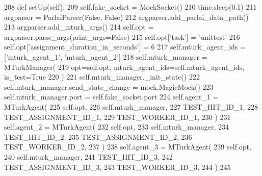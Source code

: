 \begin{DoxyCode}
208     \textcolor{keyword}{def }setUp(self):
209         self.fake\_socket = MockSocket()
210         time.sleep(0.1)
211         argparser = ParlaiParser(\textcolor{keyword}{False}, \textcolor{keyword}{False})
212         argparser.add\_parlai\_data\_path()
213         argparser.add\_mturk\_args()
214         self.opt = argparser.parse\_args(print\_args=\textcolor{keyword}{False})
215         self.opt[\textcolor{stringliteral}{'task'}] = \textcolor{stringliteral}{'unittest'}
216         self.opt[\textcolor{stringliteral}{'assignment\_duration\_in\_seconds'}] = 6
217         self.mturk\_agent\_ids = [\textcolor{stringliteral}{'mturk\_agent\_1'}, \textcolor{stringliteral}{'mturk\_agent\_2'}]
218         self.mturk\_manager = MTurkManager(
219             opt=self.opt, mturk\_agent\_ids=self.mturk\_agent\_ids, is\_test=\textcolor{keyword}{True}
220         )
221         self.mturk\_manager.\_init\_state()
222         self.mturk\_manager.send\_state\_change = mock.MagicMock()
223         self.mturk\_manager.port = self.fake\_socket.port
224         self.agent\_1 = MTurkAgent(
225             self.opt,
226             self.mturk\_manager,
227             TEST\_HIT\_ID\_1,
228             TEST\_ASSIGNMENT\_ID\_1,
229             TEST\_WORKER\_ID\_1,
230         )
231         self.agent\_2 = MTurkAgent(
232             self.opt,
233             self.mturk\_manager,
234             TEST\_HIT\_ID\_2,
235             TEST\_ASSIGNMENT\_ID\_2,
236             TEST\_WORKER\_ID\_2,
237         )
238         self.agent\_3 = MTurkAgent(
239             self.opt,
240             self.mturk\_manager,
241             TEST\_HIT\_ID\_3,
242             TEST\_ASSIGNMENT\_ID\_3,
243             TEST\_WORKER\_ID\_3,
244         )
245 
\end{DoxyCode}
\mbox{\label{classparlai_1_1mturk_1_1core_1_1dev_1_1test_1_1test__mturk__manager_1_1TestMTurkManagerUnitFunctions_a91b705565575db1f108703e1559409b1}} 
